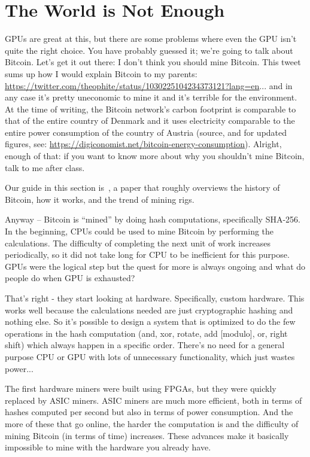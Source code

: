 \documentclass[a4paper]{report}
\begin{document}
\section*{The World is Not Enough}
GPUs are great at this, but there are some problems where even the GPU isn't quite the right choice. You have probably guessed it; we're going to talk about Bitcoin. Let's get it out there: I don't think you should mine Bitcoin. This tweet sums up how I would explain Bitcoin to my parents: \url{https://twitter.com/theophite/status/1030225104234373121?lang=en}... and in any case it's pretty uneconomic to mine it and it's terrible for the environment. At the time of writing, the Bitcoin network's carbon footprint is comparable to that of the entire country of Denmark and it uses electricity comparable to the entire power consumption of the country of Austria (source, and for updated figures, see: \url{https://digiconomist.net/bitcoin-energy-consumption}). Alright, enough of that: if you want to know more about why you shouldn't mine Bitcoin, talk to me after class. 

Our guide in this section is~\cite{bitcoin}, a paper that roughly overviews the history of Bitcoin, how it works, and the trend of mining rigs. 

Anyway -- Bitcoin is ``mined'' by doing hash computations, specifically SHA-256. In the beginning, CPUs could be used to mine Bitcoin by performing the calculations. The difficulty of completing the next unit of work increases periodically, so it did not take long for CPU to be inefficient for this purpose. GPUs were the logical step but the quest for more is always ongoing and what do people do when GPU is exhausted?

That's right - they start looking at hardware. Specifically, custom hardware. This works well because the calculations needed are just cryptographic hashing and nothing else. So it's possible to design a system that is optimized to do the few operations in the hash computation (and, xor, rotate, add [modulo], or, right shift) which always happen in a specific order. There's no need for a general purpose CPU or GPU with lots of unnecessary functionality, which just wastes power...

 The first hardware miners were built using FPGAs, but they were quickly replaced by ASIC miners. ASIC miners are much more efficient, both in terms of hashes computed per second but also in terms of power consumption. And the more of these that go online, the harder the computation is and the difficulty of mining Bitcoin (in terms of time) increases. These advances make it basically impossible to mine with the hardware you already have.
\end{document}
